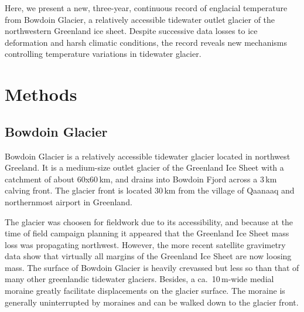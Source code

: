 \documentclass[utf8]{article}
\begin{document}
    Here, we present a new, three-year, continuous record of englacial
    temperature from Bowdoin Glacier, a relatively accessible tidewater outlet
    glacier of the northwestern Greenland ice sheet. Despite successive data
    losses to ice deformation and harsh climatic conditions, the record reveals
    new mechanisms controlling temperature variations in tidewater glacier.


\section{Methods}

\subsection{Bowdoin Glacier}

    Bowdoin Glacier is a relatively accessible tidewater glacier located in
    northwest Greeland. It is a medium-size outlet glacier of the Greenland
    Ice Sheet with a catchment of about 60x60\,km, and drains into Bowdoin
    Fjord across a 3\,km calving front. The glacier front is located 30\,km
    from the village of Qaanaaq and northernmost airport in Greenland.

    The glacier was choosen for fieldwork due to its accessibility, and
    because at the time of field campaign planning it appeared that the
    Greenland Ice Sheet mass loss was propagating northwest. However, the more
    recent satellite gravimetry data show that virtually all margins of the
    Greenland Ice Sheet are now loosing mass. The surface of Bowdoin Glacier
    is heavily crevassed but less so than that of many other greenlandic
    tidewater glaciers. Besides, a ca.~10\,m-wide medial moraine greatly
    facilitate displacements on the glacier surface. The moraine is generally
    uninterrupted by moraines and can be walked down to the glacier front.
\end{document}
